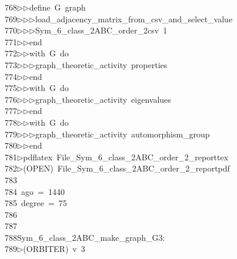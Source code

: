 \begin{tabbing}
768\>$\triangleright$\>$\triangleright$\>define\ G\ graph\ \\[0pt]
769\>$\triangleright$\>$\triangleright$\>$\triangleright$\>load\_adjacency\_matrix\_from\_csv\_and\_select\_value\ \\[0pt]
770\>$\triangleright$\>$\triangleright$\>$\triangleright$\>Sym\_6\_class\_2ABC\_order\_2csv\ 1\ \\[0pt]
771\>$\triangleright$\>$\triangleright$\>end\ \\[0pt]
772\>$\triangleright$\>$\triangleright$\>with\ G\ do\ \\[0pt]
773\>$\triangleright$\>$\triangleright$\>$\triangleright$\>graph\_theoretic\_activity\ properties\ \\[0pt]
774\>$\triangleright$\>$\triangleright$\>end\ \\[0pt]
775\>$\triangleright$\>$\triangleright$\>with\ G\ do\ \\[0pt]
776\>$\triangleright$\>$\triangleright$\>$\triangleright$\>graph\_theoretic\_activity\ eigenvalues\ \\[0pt]
777\>$\triangleright$\>$\triangleright$\>end\ \\[0pt]
778\>$\triangleright$\>$\triangleright$\>with\ G\ do\ \\[0pt]
779\>$\triangleright$\>$\triangleright$\>$\triangleright$\>graph\_theoretic\_activity\ automorphism\_group\ \\[0pt]
780\>$\triangleright$\>$\triangleright$\>end\\[0pt]
781\>$\triangleright$\>pdflatex\ File\_Sym\_6\_class\_2ABC\_order\_2\_reporttex\\[0pt]
782\>$\triangleright$\>(OPEN)\ File\_Sym\_6\_class\_2ABC\_order\_2\_reportpdf\\[0pt]
783\>\\[0pt]
784\>\ ago\ =\ 1440\\[0pt]
785\>\ degree\ =\ 75\\[0pt]
786\>\\[0pt]
787\>\\[0pt]
788\>Sym\_6\_class\_2ABC\_make\_graph\_G3:\\[0pt]
789\>$\triangleright$\>(ORBITER)\ v\ 3\ \\[0pt]

\end{tabbing}
